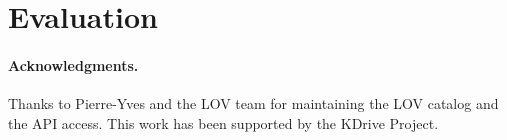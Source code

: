\documentclass{sig-alternate}
\begin{document}
%


\vspace{3mm}
\section{Evaluation}\label{sec:conclusion}




\vspace{1mm}
\paragraph{\textbf{Acknowledgments.}} %
Thanks to Pierre-Yves and the LOV team for maintaining the LOV catalog and the API access. This work has been supported by the KDrive Project.



\balancecolumns
\end{document}
